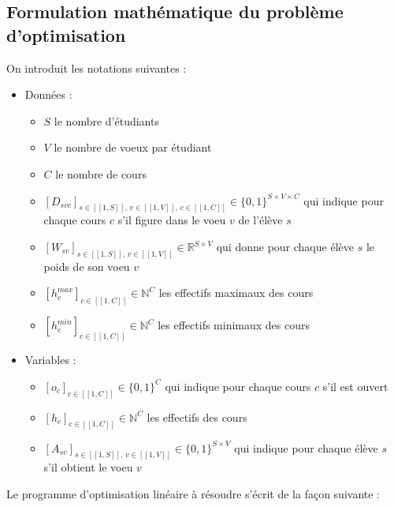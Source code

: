\documentclass[12pt]{article}
\begin{document}
    \subsection{Formulation mathématique du problème d’optimisation}

On introduit les notations suivantes :  

\begin{itemize}
  \item Données : 
  \begin{itemize}
    \item $S$ le nombre d'étudiants
    \item $V$ le nombre de voeux par étudiant
    \item $C$ le nombre de cours
    \item $[D_{svc}]_{s \in [\![1, S]\!], \,v \in [\![1, V]\!], \,c \in [\![1, C]\!]} \in \{ 0,1\} ^{S \times V \times C}$ qui indique pour chaque cours $c$ s'il figure dans le voeu $v$ de l'élève $s$
    \item $[W_{sv}]_{s \in [\![1, S]\!], \,v \in [\![1, V]\!] } \in \mathbb{R}^{S \times V}$ qui donne pour chaque élève $s$ le poids de son voeu $v$
    \item $[h_c^{max}]_{c \in [\![1, C]\!]} \in \mathbb{N}^C$ les effectifs maximaux des cours
    \item $[h_c^{min}]_{c \in [\![1, C]\!]} \in \mathbb{N}^C$ les effectifs minimaux des cours
  \end{itemize}
  \item Variables : 
  \begin{itemize}
    \item $[o_c]_{c \in [\![1, C]\!]} \in\{ 0,1\} ^{C}$ qui indique pour chaque cours $c$ s'il est ouvert
    \item $[h_c]_{c \in [\![1, C]\!]} \in \mathbb{N}^C$ les effectifs des cours
    \item $[A_{sv}]_{s \in [\![1, S]\!], \,v \in [\![1, V]\!] } \in\{ 0,1\} ^{S \times V}$ qui indique pour chaque élève $s$ s'il obtient le voeu $v$
  \end{itemize}
\end{itemize}

\bigskip 

Le programme d’optimisation linéaire à résoudre s’écrit de la façon suivante :  \\
\end{document}
